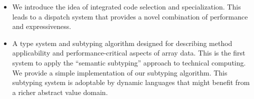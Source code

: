 \begin{itemize}
\iffalse
Our first contribution is a discussion of the nature of technical computing
that suggests which language-level abstractions might best support real use
cases.
Simply put technical computing has by and large happened
without sufficient probing and analysis as to what it is.
Our looking at the space in this manner has lead to a novel design.
The success of this design is resonating with users worldwide.

Based on the theory that technical computing is characterized by complex
operators and particular combinations of binding time behavior.
\fi

\item We introduce the idea of integrated code selection and specialization.
This leads to a dispatch system that provides a novel combination of
performance and expressiveness.







\item A type system and subtyping algorithm designed for describing
method applicability and performance-critical aspects of array data.
This is the first system to apply the ``semantic subtyping'' approach
to technical computing.
We provide a simple implementation of our subtyping algorithm.
This subtyping system is adoptable by dynamic languages that might
benefit from a richer abstract value domain.


\end{itemize}
